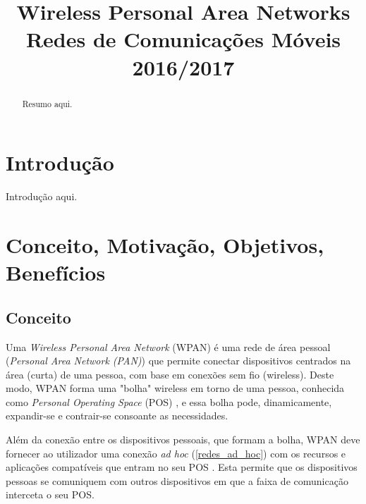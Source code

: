 \documentclass[conference]{IEEEtran}
\begin{document}
\title{Wireless Personal Area Networks\\
  \large Redes de Comunicações Móveis\\
  2016/2017
}

\author{
\and
{}
}

\maketitle

\begin{abstract}
Resumo aqui.
\end{abstract}


\IEEEpeerreviewmaketitle


\section{Introdução}
Introdução aqui.

\section{Conceito, Motivação, Objetivos, Benefícios}

\subsection{Conceito}

Uma \textit{Wireless Personal Area Network} (WPAN) é uma rede de área pessoal (\textit{Personal Area Network (PAN)}) que permite conectar dispositivos centrados na área (curta) de uma pessoa, com base em conexões sem fio (wireless). Deste modo, WPAN forma uma "bolha" wireless em torno de uma pessoa, conhecida como \textit{Personal Operating Space} (POS) \cite{prasad2004ofdm}, e essa bolha pode, dinamicamente, expandir-se e contrair-se consoante as necessidades.

Além da conexão entre os dispositivos pessoais, que formam a bolha, WPAN deve fornecer ao utilizador uma conexão \textit{ad hoc} (\ref{redes_ad_hoc}) com os recursos e aplicações compatíveis que entram no seu POS \cite{prasad2004ofdm}.
Esta permite que os dispositivos pessoas se comuniquem com outros dispositivos em que a faixa de comunicação interceta o seu POS.
\end{document}
